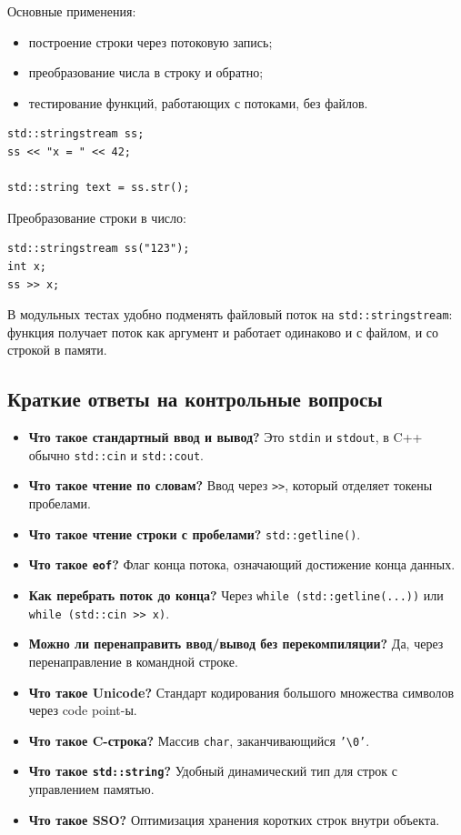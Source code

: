 Основные применения:
\begin{itemize}
    \item построение строки через потоковую запись;
    \item преобразование числа в строку и обратно;
    \item тестирование функций, работающих с потоками, без файлов.
\end{itemize}

\begin{example}
\begin{verbatim}
std::stringstream ss;
ss << "x = " << 42;

std::string text = ss.str();
\end{verbatim}
\end{example}

Преобразование строки в число:
\begin{verbatim}
std::stringstream ss("123");
int x;
ss >> x;
\end{verbatim}

\begin{remark}
В модульных тестах удобно подменять файловый поток на \texttt{std::stringstream}: функция получает поток как аргумент и работает одинаково и с файлом, и со строкой в памяти.
\end{remark}

\subsection{Краткие ответы на контрольные вопросы}
\begin{itemize}
    \item \textbf{Что такое стандартный ввод и вывод?} Это \texttt{stdin} и \texttt{stdout}, в C++ обычно \texttt{std::cin} и \texttt{std::cout}.
    \item \textbf{Что такое чтение по словам?} Ввод через \texttt{>>}, который отделяет токены пробелами.
    \item \textbf{Что такое чтение строки с пробелами?} \texttt{std::getline()}.
    \item \textbf{Что такое \texttt{eof}?} Флаг конца потока, означающий достижение конца данных.
    \item \textbf{Как перебрать поток до конца?} Через \texttt{while (std::getline(...))} или \texttt{while (std::cin >> x)}.
    \item \textbf{Можно ли перенаправить ввод/вывод без перекомпиляции?} Да, через перенаправление в командной строке.
    \item \textbf{Что такое Unicode?} Стандарт кодирования большого множества символов через code point-ы.
    \item \textbf{Что такое C-строка?} Массив \texttt{char}, заканчивающийся \texttt{'\textbackslash 0'}.
    \item \textbf{Что такое \texttt{std::string}?} Удобный динамический тип для строк с управлением памятью.
    \item \textbf{Что такое SSO?} Оптимизация хранения коротких строк внутри объекта.
\end{itemize}
